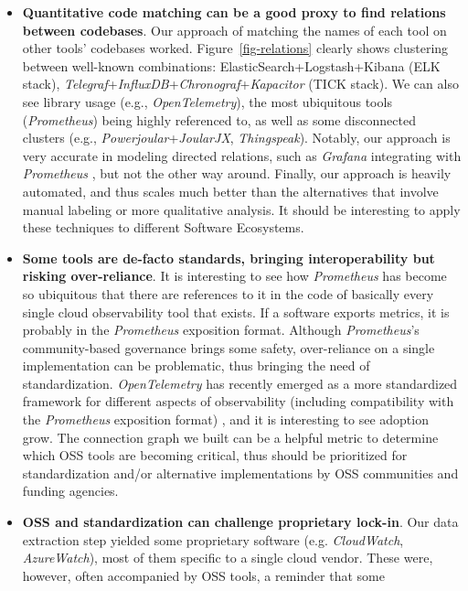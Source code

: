 \documentclass[sigconf]{acmart}
\begin{document}
\begin{itemize}
\item
  \textbf{Quantitative code matching can be a good proxy to find
  relations between codebases}. Our approach of matching the names of
  each tool on other tools' codebases worked.
  Figure~\ref{fig-relations} clearly shows clustering between
  well-known combinations: ElasticSearch+Logstash+Kibana (ELK stack),
  \emph{Telegraf}+\emph{InfluxDB}+\emph{Chronograf}+\emph{Kapacitor}
  (TICK stack). We can also see library usage (e.g.,
  \emph{OpenTelemetry}), the most ubiquitous tools (\emph{Prometheus})
  being highly referenced to, as well as some disconnected clusters
  (e.g., \emph{Powerjoular}+\emph{JoularJX}, \emph{Thingspeak}).
  Notably, our approach is very accurate in modeling directed relations,
  such as \emph{Grafana} integrating with \emph{Prometheus}
  \cite{grafana-prometheus-docs}, but not the other way around.
  Finally, our approach is heavily automated, and thus scales much
  better than the alternatives that involve manual labeling or more
  qualitative analysis. It should be interesting to apply these
  techniques to different Software Ecosystems.
\item
  \textbf{Some tools are de-facto standards, bringing interoperability
  but risking over-reliance}. It is interesting to see how
  \emph{Prometheus} has become so ubiquitous that there are references
  to it in the code of basically every single cloud observability tool
  that exists. If a software exports metrics, it is probably in the
  \emph{Prometheus} exposition format. Although \emph{Prometheus}'s
  community-based governance brings some safety, over-reliance on a
  single implementation can be problematic, thus bringing the need of
  standardization. \emph{OpenTelemetry} has recently emerged as a more
  standardized framework for different aspects of observability
  (including compatibility with the \emph{Prometheus} exposition format)
  \cite{prometheusotel}, and it is interesting to see adoption grow.
  The connection graph we built can be a helpful metric to determine
  which OSS tools are becoming critical, thus should be prioritized for
  standardization and/or alternative implementations by OSS communities
  and funding agencies.
\item
  \textbf{OSS and standardization can challenge proprietary lock-in}. Our data
  extraction step yielded some proprietary software (e.g. \emph{CloudWatch},
  \emph{AzureWatch}), most of them specific to a single cloud vendor.
  These were, however, often accompanied by OSS tools, a reminder that some

\end{itemize}
\end{document}
